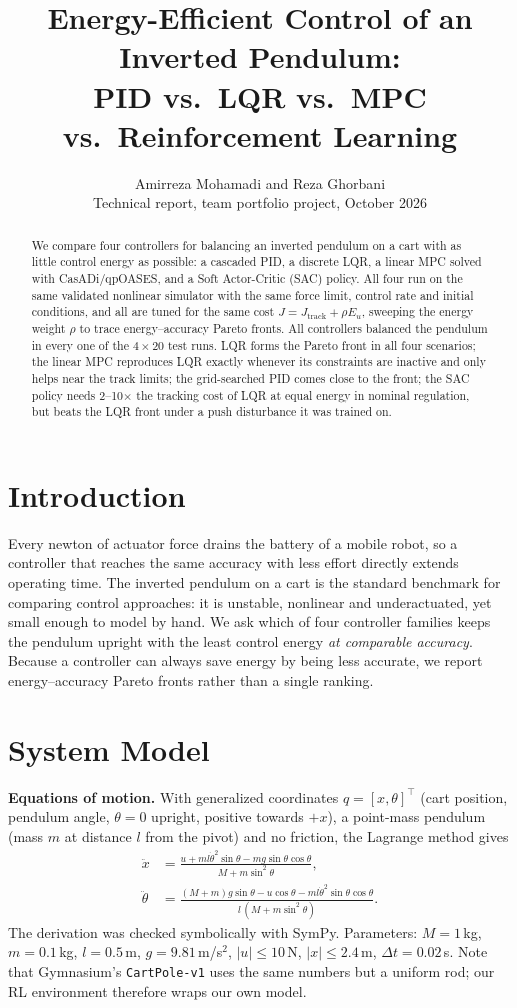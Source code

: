 \documentclass[10pt,twocolumn,a4paper]{article}
\title{\vspace{-1.2cm}\textbf{Energy-Efficient Control of an Inverted Pendulum:\\
PID vs.\ LQR vs.\ MPC vs.\ Reinforcement Learning}}
\author{Amirreza Mohamadi and Reza Ghorbani\\
\small Technical report, team portfolio project, October 2026}
\date{}
\begin{document}
\maketitle

\begin{abstract}
We compare four controllers for balancing an inverted pendulum on a cart with
as little control energy as possible: a cascaded PID, a discrete LQR, a linear
MPC solved with CasADi/qpOASES, and a Soft Actor-Critic (SAC) policy. All four
run on the same validated nonlinear simulator with the same force limit,
control rate and initial conditions, and all are tuned for the same cost
$J = J_\mathrm{track} + \rho E_u$, sweeping the energy weight $\rho$ to trace
energy--accuracy Pareto fronts.
All controllers balanced the pendulum in every one of the $4\times20$ test
runs. LQR forms the Pareto front in all four scenarios; the linear MPC
reproduces LQR exactly whenever its constraints are inactive and only helps
near the track limits; the grid-searched PID comes close to the front; the
SAC policy needs 2--10$\times$ the tracking cost of LQR at equal energy in
nominal regulation, but beats the LQR front under a push disturbance it was
trained on.
\end{abstract}

\section{Introduction}
Every newton of actuator force drains the battery of a mobile robot, so a
controller that reaches the same accuracy with less effort directly extends
operating time. The inverted pendulum on a cart is the standard benchmark for
comparing control approaches: it is unstable, nonlinear and underactuated, yet
small enough to model by hand. We ask which of four controller families keeps
the pendulum upright with the least control energy \emph{at comparable
accuracy}. Because a controller can always save energy by being less accurate,
we report energy--accuracy Pareto fronts rather than a single ranking.

\section{System Model}
\textbf{Equations of motion.} With generalized coordinates $q=[x,\theta]^\top$
(cart position, pendulum angle, $\theta=0$ upright, positive towards $+x$), a
point-mass pendulum (mass $m$ at distance $l$ from the pivot) and no friction,
the Lagrange method gives
\begin{align}
\ddot x &= \frac{u + ml\dot\theta^2\sin\theta - mg\sin\theta\cos\theta}{M+m\sin^2\theta},\label{eq:xdd}\\
\ddot\theta &= \frac{(M+m)g\sin\theta - u\cos\theta - ml\dot\theta^2\sin\theta\cos\theta}{l\,(M+m\sin^2\theta)}.\label{eq:thdd}
\end{align}
The derivation was checked symbolically with SymPy. Parameters: $M=1$\,kg,
$m=0.1$\,kg, $l=0.5$\,m, $g=9.81$\,m/s$^2$, $|u|\le 10$\,N, $|x|\le 2.4$\,m,
$\Delta t=0.02$\,s. Note that Gymnasium's \texttt{CartPole-v1} uses the same
numbers but a uniform rod; our RL environment therefore wraps our own model.
\end{document}
